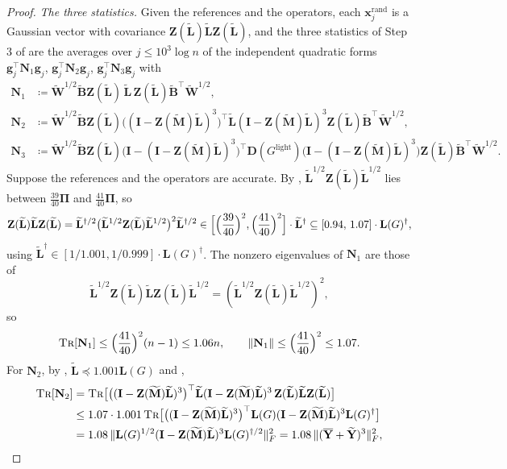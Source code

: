 \documentclass[11pt]{article}
\theoremstyle{remark}
\newcommand{\BB}{\mathbf B}
\newcommand{\BBtil}{{\widetilde{\BB}}}
\newcommand{\DD}{\mathbf D}
\renewcommand{\gg}{{\mathbf g}}
\newcommand{\II}{\mathbf I}
\newcommand{\LL}{\mathbf L}
\newcommand{\LLtil}{{\widetilde{\LL}}}
\newcommand{\MM}{\mathbf M}
\newcommand{\MMtil}{{\widetilde{\MM}}}
\newcommand{\NN}{\mathbf N}
\newcommand{\PPi}{{\boldsymbol\Pi}}
\newcommand{\WW}{\mathbf W}
\newcommand{\WWtil}{{\widetilde{\WW}}}
\newcommand{\xx}{\mathbf x}
\newcommand{\xxrand}{\xx^{\mathrm{rand}}}
\newcommand{\YY}{\mathbf{Y}}
\newcommand{\YYbar}{{\overline{\YY}}}
\newcommand{\YYtil}{{\widetilde{\YY}}}
\newcommand{\ZZ}{\mathbf Z}
\newcommand{\Gl}{G^{\mathrm{light}}}
\newcommand{\defeq}{\coloneqq}
\newcommand{\norm}[1]{\lVert#1\rVert}
\newcommand{\tr}{\textsc{Tr}}
\begin{document}
\begin{proof}
\emph{The three statistics.}
Given the references and the operators, each $\xxrand_j$ is a Gaussian
vector with covariance $\ZZ(\LLtil)\LLtil\ZZ(\LLtil)$, and the three
statistics of Step 3 of  are the averages over
$j\le10^{3}\log n$ of the independent quadratic forms
$\gg_j^{\top}\NN_1\gg_j$, $\gg_j^{\top}\NN_2\gg_j$, $\gg_j^{\top}\NN_3\gg_j$
with
\begin{equation}\label{eq:forms}
\begin{aligned}
\NN_1&\defeq\WWtil^{1/2}\BBtil\ZZ(\LLtil)\,\LLtil\,\ZZ(\LLtil)\BBtil^{\top}\WWtil^{1/2},\\
\NN_2&\defeq\WWtil^{1/2}\BBtil\ZZ(\LLtil)\bigl((\II-\ZZ(\MMtil)\LLtil)^{3}\bigr)^{\top}\LLtil(\II-\ZZ(\MMtil)\LLtil)^{3}\ZZ(\LLtil)\BBtil^{\top}\WWtil^{1/2},\\
\NN_3&\defeq\WWtil^{1/2}\BBtil\ZZ(\LLtil)\bigl(\II-(\II-\ZZ(\MMtil)\LLtil)^{3}\bigr)^{\top}\DD(\Gl)\bigl(\II-(\II-\ZZ(\MMtil)\LLtil)^{3}\bigr)\ZZ(\LLtil)\BBtil^{\top}\WWtil^{1/2}.
\end{aligned}
\end{equation}
Suppose the references and the operators are accurate.
By , $\LLtil^{1/2}\ZZ(\LLtil)\LLtil^{1/2}$ lies between
$\frac{39}{40}\PPi$ and $\frac{41}{40}\PPi$, so
\begin{equation}\label{eq:cov}
\ZZ(\LLtil)\LLtil\ZZ(\LLtil)
=\LLtil^{\dag/2}\bigl(\LLtil^{1/2}\ZZ(\LLtil)\LLtil^{1/2}\bigr)^{2}\LLtil^{\dag/2}
\in\Bigl[\Bigl(\frac{39}{40}\Bigr)^{2},\Bigl(\frac{41}{40}\Bigr)^{2}\Bigr]\cdot\LLtil^{\dag}
\subseteq[0.94,\,1.07]\cdot\LL(G)^{\dag},
\end{equation}
using $\LLtil^{\dag}\in[1/1.001,1/0.999]\cdot\LL(G)^{\dag}$.
The nonzero eigenvalues of $\NN_1$ are those of
\[
\LLtil^{1/2}\ZZ(\LLtil)\LLtil\ZZ(\LLtil)\LLtil^{1/2}=(\LLtil^{1/2}\ZZ(\LLtil)\LLtil^{1/2})^{2},
\]
so
\[
\tr[\NN_1]\le\Bigl(\frac{41}{40}\Bigr)^{2}(n-1)\le1.06n,
\qquad
\norm{\NN_1}\le\Bigl(\frac{41}{40}\Bigr)^{2}\le1.07 .
\]
For $\NN_2$, by , $\LLtil\preceq1.001\LL(G)$ and
,
\begin{align*}
\tr[\NN_2]
&=\tr\bigl[\bigl((\II-\ZZ(\MMtil)\LLtil)^{3}\bigr)^{\top}\LLtil(\II-\ZZ(\MMtil)\LLtil)^{3}\,\ZZ(\LLtil)\LLtil\ZZ(\LLtil)\bigr]\\
&\le1.07\cdot1.001\,\tr\bigl[\bigl((\II-\ZZ(\MMtil)\LLtil)^{3}\bigr)^{\top}\LL(G)(\II-\ZZ(\MMtil)\LLtil)^{3}\LL(G)^{\dag}\bigr]\\
&=1.08\,\norm{\LL(G)^{1/2}(\II-\ZZ(\MMtil)\LLtil)^{3}\LL(G)^{\dag/2}}_F^{2}
=1.08\,\norm{(\YYbar+\YYtil)^{3}}_F^{2},

\end{align*}
\end{proof}
\end{document}
